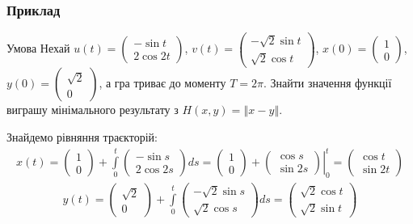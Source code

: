\documentclass[10pt,pdf,aspectratio=169]{beamer}
\renewcommand{\l}{\left}
\renewcommand{\r}{\right}
\newcommand{\norm}[1]{\left\Vert #1 \right\Vert}
\newcommand{\intl}{\int\limits}
\begin{document}
    \begin{frame}
        \frametitle{Приклад}
        \begin{block}{Умова}
            Нехай $u(t) = \begin{pmatrix} -\sin t \\ 2 \cos {2t}\end{pmatrix}$, 
            $v(t) = \begin{pmatrix} -\sqrt{2}\sin t \\ \sqrt{2}\cos t \end{pmatrix}$,
            $x(0) = \begin{pmatrix} 1 \\ 0 \end{pmatrix}$, 
            $y(0) = \begin{pmatrix} \sqrt{2} \\ 0 \end{pmatrix}$, 
            а гра триває до моменту $T = 2\pi$.
            Знайти значення функції виграшу мінімального результату з $H(x, y) = \norm{x - y}$.    
        \end{block}
        Знайдемо рівняння траєкторій:
        \begin{gather*}
            x(t) = \begin{pmatrix} 1 \\ 0 \end{pmatrix} +
            \intl_0^t \begin{pmatrix} -\sin s \\ 2 \cos {2s} \end{pmatrix} ds = 
            \begin{pmatrix} 1 \\ 0 \end{pmatrix} +
            \l.\begin{pmatrix} \cos s \\ \sin{2s} \end{pmatrix}\r|_0^t = 
            \begin{pmatrix} \cos t \\ \sin{2t} \end{pmatrix}
        \end{gather*}
        \begin{gather*}
            y(t) = \begin{pmatrix} \sqrt{2} \\ 0 \end{pmatrix} +
            \intl_0^t \begin{pmatrix} -\sqrt{2}\sin s \\ \sqrt{2}\cos s  \end{pmatrix} ds = 
            \begin{pmatrix} \sqrt{2}\cos t \\ \sqrt{2}\sin t \end{pmatrix}
        \end{gather*}
    \end{frame}
\end{document}
